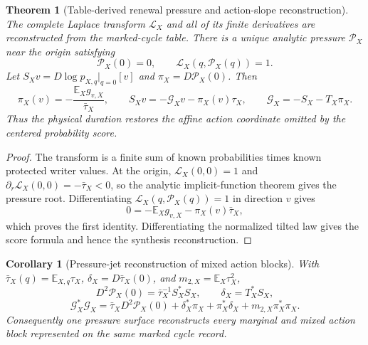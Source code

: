 \documentclass[11pt]{article}
\newtheorem{theorem}{Theorem}[section]
\newtheorem{corollary}[corollary]{Corollary}
\theoremstyle{definition}
\theoremstyle{remark}
\begin{document}
\begin{theorem}[Table-derived renewal pressure and action-slope reconstruction]
\label{thm:supp-reward-pressure}
The complete Laplace transform $\mathcal L_X$ and all of its finite derivatives
are reconstructed from the marked-cycle table.  There is a unique analytic
pressure $\mathcal P_X$ near the origin satisfying
\[
 \mathcal P_X(0)=0,
 \qquad
 \mathcal L_X(q,\mathcal P_X(q))=1.
\]
Let $S_Xv=D\log p_{X,q}|_{q=0}[v]$ and $\pi_X=D\mathcal P_X(0)$.  Then
\begin{equation}
 \boxed{
 \pi_X(v)=-\frac{\mathbb E_Xg_{v,X}}{\bar\tau_X},
 \qquad
 S_Xv=-\mathscr G_Xv-\pi_X(v)\tau_X,
 \qquad
 \mathscr G_X=-S_X-T_X\pi_X.}
 \label{eq:supp-pressure-action-slope}
\end{equation}
Thus the physical duration restores the affine action coordinate omitted by the
centered probability score.
\end{theorem}

\begin{proof}
The transform is a finite sum of known probabilities times known protected
writer values.  At the origin, $\mathcal L_X(0,0)=1$ and
$\partial_r\mathcal L_X(0,0)=-\bar\tau_X<0$, so the analytic implicit-function
theorem gives the pressure root.  Differentiating
$\mathcal L_X(q,\mathcal P_X(q))=1$ in direction $v$ gives
\[
 0=-\mathbb E_Xg_{v,X}-\pi_X(v)\bar\tau_X,
\]
which proves the first identity.  Differentiating the normalized tilted law
gives the score formula and hence the synthesis reconstruction.
\end{proof}

\begin{corollary}[Pressure-jet reconstruction of mixed action blocks]
\label{cor:supp-pressure-jet}
With $\bar\tau_X(q)=\mathbb E_{X,q}\tau_X$,
$\delta_X=D\bar\tau_X(0)$, and
$m_{2,X}=\mathbb E_X\tau_X^2$,
\begin{equation}
 \boxed{
 D^2\mathcal P_X(0)=\bar\tau_X^{-1}S_X^*S_X,\qquad
 \delta_X=T_X^*S_X,}
 \label{eq:supp-pressure-jet-a}
\end{equation}
\begin{equation}
 \boxed{
 \mathscr G_X^*\mathscr G_X
 =\bar\tau_XD^2\mathcal P_X(0)
 +\delta_X^*\pi_X+\pi_X^*\delta_X
 +m_{2,X}\pi_X^*\pi_X.}
 \label{eq:supp-pressure-jet-b}
\end{equation}
Consequently one pressure surface reconstructs every marginal and mixed action
block represented on the same marked cycle record.
\end{corollary}
\end{document}
